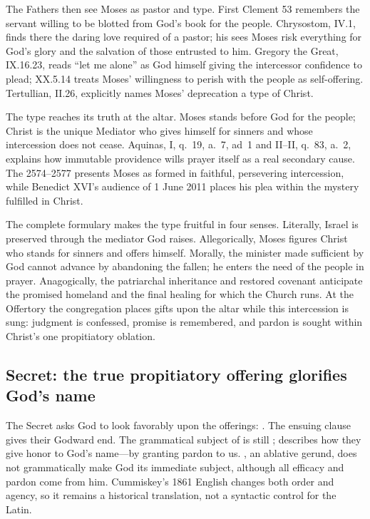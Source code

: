 The Fathers then see Moses as pastor and type. First Clement 53 remembers the
servant willing to be blotted from God's book for the people. Chrysostom,
 IV.1, finds there the daring love required of a
pastor; his  sees Moses risk everything for God's
glory and the salvation of those entrusted to him. Gregory the Great,
 IX.16.23, reads ``let me alone'' as God himself giving the
intercessor confidence to plead;  XX.5.14 treats Moses'
willingness to perish with the people as self-offering. Tertullian,
 II.26, explicitly names Moses' deprecation a type of
Christ.

The type reaches its truth at the altar. Moses stands before God for the
people; Christ is the unique Mediator who gives himself for sinners and whose
intercession does not cease. Aquinas,  I, q.~19, a.~7, ad~1 and
II--II, q.~83, a.~2, explains how immutable providence wills prayer itself as
a real secondary cause. The  2574--2577 presents Moses as
formed in faithful, persevering intercession, while Benedict XVI's audience of
1 June 2011 places his plea within the mystery fulfilled in Christ.

The complete formulary makes the type fruitful in four senses. Literally,
Israel is preserved through the mediator God raises. Allegorically, Moses
figures Christ who stands for sinners and offers himself. Morally, the minister
made sufficient by God cannot advance by abandoning the fallen; he enters the
need of the people in prayer. Anagogically, the patriarchal inheritance and
restored covenant anticipate the promised homeland and the final healing for
which the Church runs. At the Offertory the congregation places gifts upon the
altar while this intercession is sung: judgment is confessed, promise is
remembered, and pardon is sought within Christ's one propitiatory oblation.

\elementguard
\subsection*{Secret: the true propitiatory offering glorifies God's name }

The Secret asks God to look favorably upon the offerings:
. The ensuing
 clause gives their Godward end. The grammatical subject of
 is still ; 
describes how they give honor to God's name---by granting pardon to us.
, an ablative gerund, does not grammatically make God its
immediate subject, although all efficacy and pardon come from him. Cummiskey's 1861
English changes both order and agency, so it remains a historical translation,
not a syntactic control for the Latin.

